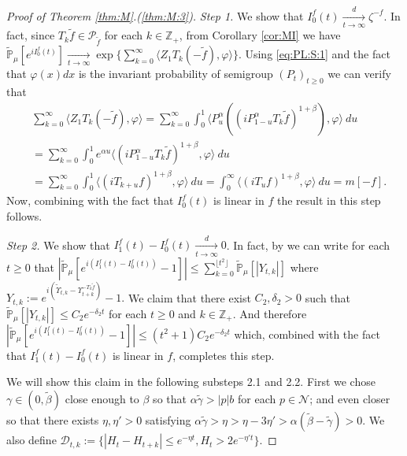 \documentclass[12pt,a4paper]{amsart}
\theoremstyle{plain}
\theoremstyle{definition}
\numberwithin{equation}{section}
\begin{document}
\begin{proof}[Proof of Theorem \ref{thm:M}.(\ref{thm:M:3})]
\emph{Step 1.} We show that $I^f_0(t) \xrightarrow [t\to \infty]{d} \zeta^{-f}$.
In fact, since $T_k\tilde f \in \mathcal P_{\tilde f}$ for each $k\in \mathbb Z_+$, from Corollary \ref{cor:MI} we have $\widetilde{ \mathbb P}_\mu[e^{i I_0^f(t)}]\xrightarrow[t\to \infty]{}\exp\{\sum_{k=0}^\infty \langle Z_1T_k(-\tilde f),\varphi\rangle\}$. 
Using \eqref{eq:PL:S:1} and the fact that $\varphi(x)dx$ is the invariant probability of semigroup $(P_t)_{t\geq 0}$ we can verify that
\begin{align}
  \label{eq:PM:CLTS:2}
  & \sum_{k=0}^\infty \langle Z_1 T_{k} (-\tilde f), \varphi \rangle
    = \sum_{k=0}^\infty \int_0^1 \langle P_u^\alpha ((iP_{1 - u}^\alpha T_k \tilde f)^{1+\beta}), \varphi\rangle ~du
  \\& = \sum_{k=0}^\infty \int_0^1 e^{\alpha u} \langle  (iP_{1 - u}^\alpha T_{k}\tilde f)^{1+\beta}, \varphi \rangle ~du
  \\& = \sum_{k=0}^\infty \int_0^1 \langle  (iT_{k+ u} f)^{1+\beta}, \varphi\rangle~du
  = \int_0^\infty \langle  (iT_{u} f)^{1+\beta}, \varphi\rangle~du = m[-f].
\end{align}
Now, combining with the fact that $I_0^f(t)$ is linear in $f$ the result in this step follows.

\emph{Step 2.} We show that $I^f_1(t) - I^f_0(t) \xrightarrow[t\to \infty]{d} 0$. 
In fact, by \cite[Lemma 3.4.3]{Durrett2010Probability} we can write for each $t\geq 0$ that $|\widetilde {\mathbb P}_{\mu}[e^{i(I_{1}^{f}(t) - I_0^f(t))} - 1]| \leq \sum_{k=0}^{\lfloor t^2 \rfloor} \widetilde {\mathbb {P}}_\mu[|Y_{t,k}|]$ where $Y_{t,k} := e^{i(\widetilde {\Upsilon}_{t,k} - \Upsilon_{t+k}^{-T_{k}\widetilde {f}})} - 1. $
We claim that there exist $C_2, \delta_2>0$ such that $\widetilde {\mathbb {P}}_\mu[|Y_{t,k}|] \leq C_2e^{-\delta_2 t}$ for each $t\geq 0$ and $k \in \mathbb Z_+$. 
And therefore $|\widetilde {\mathbb P}_{\mu}[e^{i(I_{1}^{f}(t) - I_0^f(t))} - 1]| \leq (t^2+1)C_2e^{-\delta_2 t}$ which, combined with the fact that $I_1^f(t) - I_0^f(t)$ is linear in $f$, completes this step.

We will show this claim in the following substeps 2.1 and 2.2.
First we chose $\gamma\in(0,\tilde \beta)$ close enough to $\beta$ so that $\alpha \tilde \gamma > |p|b$ for each $p\in \mathcal N$; and even closer so that there exists $\eta,\eta'>0$ satisfying $\alpha \tilde \gamma > \eta>\eta - 3\eta'> \alpha (\tilde \beta - \tilde \gamma)>0$. We also define $\mathcal{D}_{t,k} :=\{|H_t-H_{t+k}|\leq  e^{-\eta t}, H_{t}> 2e^{-\eta' t}\}$.



\end{proof}
\end{document}
